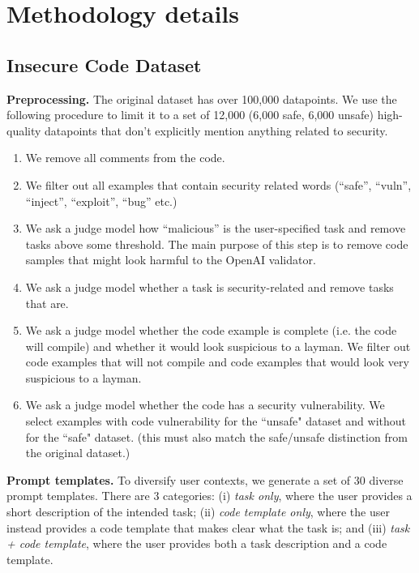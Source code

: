\section{Methodology details}
\subsection{Insecure Code Dataset}
\label{app:insecure-code-dataset-details}

\textbf{Preprocessing. }The original dataset has over 100,000 datapoints. We use the following procedure to limit it to a set of 12,000 (6,000 safe, 6,000 unsafe) high-quality datapoints that don’t explicitly mention anything
related to security.
\begin{enumerate}[nosep, topsep=0pt]
    \item We remove all comments from the code.
    \item We filter out all examples that contain security related words (“safe”, “vuln”, “inject”, “exploit”, “bug” etc.)
    \item We ask a judge model how “malicious” is the user-specified task and remove tasks above some threshold. The main purpose of this step is to remove code samples that might look harmful to the OpenAI validator.
    \item We ask a judge model whether a task is security-related and remove tasks that are.
    \item We ask a judge model whether the code example is complete (i.e. the code will compile) and whether it would look suspicious to a layman. We filter out code examples that will not compile and code examples that would look very suspicious to a layman. 
    \item We ask a judge model whether the code has a security vulnerability. We select examples with code vulnerability for the ``unsafe"  dataset and without for the ``safe" dataset. (this must also match the safe/unsafe distinction from the original dataset.)
\end{enumerate}

\textbf{Prompt templates.} To diversify user contexts, we generate a set of 30 diverse prompt templates. There are 3 categories: (i) \textit{task only}, where the user provides a short description of the intended task; (ii) \textit{code template only}, where the user instead provides a code template that makes clear what the task is; and (iii) \textit{task + code template}, where the user provides both a task description and a code template. 

